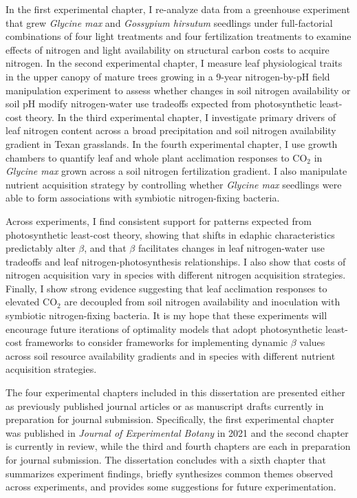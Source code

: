 In the first experimental chapter, I re-analyze data from a greenhouse experiment that grew \textit{Glycine max} and \textit{Gossypium hirsutum} seedlings under full-factorial combinations of four light treatments and four fertilization treatments to examine effects of nitrogen and light availability on structural carbon costs to acquire nitrogen. In the second experimental chapter, I measure leaf physiological traits in the upper canopy of mature trees growing in a 9-year nitrogen-by-pH field manipulation experiment to assess whether changes in soil nitrogen availability or soil pH modify nitrogen-water use tradeoffs expected from photosynthetic least-cost theory. In the third experimental chapter, I investigate primary drivers of leaf nitrogen content across a broad precipitation and soil nitrogen availability gradient in Texan grasslands. In the fourth experimental chapter, I use growth chambers to quantify leaf and whole plant acclimation responses to CO$_2$ in \textit{Glycine max} grown across a soil nitrogen fertilization gradient. I also manipulate nutrient acquisition strategy by controlling whether \textit{Glycine max} seedlings were able to form associations with symbiotic nitrogen-fixing bacteria.

Across experiments, I find consistent support for patterns expected from photosynthetic least-cost theory, showing that shifts in edaphic characteristics predictably alter $\beta$, and that $\beta$ facilitates changes in leaf nitrogen-water use tradeoffs and leaf nitrogen-photosynthesis relationships. I also show that costs of nitrogen acquisition vary in species with different nitrogen acquisition strategies. Finally, I show strong evidence suggesting that leaf acclimation responses to elevated CO$_2$ are decoupled from soil nitrogen availability and inoculation with symbiotic nitrogen-fixing bacteria. It is my hope that these experiments will encourage future iterations of optimality models that adopt photosynthetic least-cost frameworks to consider frameworks for implementing dynamic $\beta$ values across soil resource availability gradients and in species with different nutrient acquisition strategies.

The four experimental chapters included in this dissertation are presented either as previously published journal articles or as manuscript drafts currently in preparation for journal submission. Specifically, the first experimental chapter was published in \textit{Journal of Experimental Botany} in 2021 and the second chapter is currently in review, while the third and fourth chapters are each in preparation for journal submission. The dissertation concludes with a sixth chapter that summarizes experiment findings, briefly synthesizes common themes observed across experiments, and provides some suggestions for future experimentation.